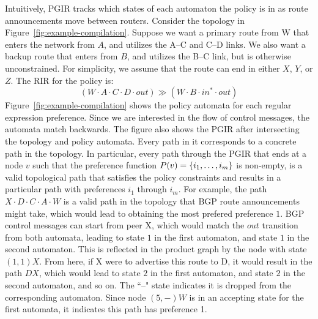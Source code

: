Intuitively, PGIR tracks which states of each automaton the policy is in as route announcements move between routers.
%
Consider the topology in Figure~\ref{fig:example-compilation}. Suppose we want a primary route from W that enters the network from $A$, and utilizes the A--C and C--D links. We also want a backup route that enters from $B$, and utilizes the B--C link, but is otherwise unconstrained. For simplicity, we assume that the route can end in either $X$, $Y$, or $Z$. The RIR for the policy is:
%
$$(W \cdot A \cdot C \cdot D \cdot out) \gg (W \cdot B \cdot in^* \cdot out)$$
%
Figure~\ref{fig:example-compilation} shows the policy automata for each regular expression preference. Since we are interested in the flow of control messages, the automata match backwards.
%
The figure also shows the PGIR after intersecting the topology and policy automata. Every path in it corresponds to a concrete path in the topology. In particular, every path through the PGIR that ends at a node $v$ such that the preference function $P(v) = \{ i_1, \dots, i_m \} $ is non-empty, is a valid topological path that satisfies the policy constraints and results in a particular path with preferences $i_1$ through $i_m$.
%
For example, the path $X \cdot D \cdot C \cdot A \cdot W$ is a valid path in the topology that BGP route announcements might take, which would lead to obtaining the most prefered preference $1$.
BGP control messages can start from peer X, which would match the $out$ transition from both automata, leading to state $1$ in the first automaton, and state $1$ in the second automaton. This is reflected in the product graph by the node with state $(1,1) X$. From here, if X were to advertise this route to D, it would result in the path $D X$, which would lead to state $2$ in the first automaton, and state $2$ in the second automaton, and so on.
%
The ``--" state indicates it is dropped from the corresponding automaton. Since node $(5,-) W$ is in an accepting state for the first automata, it indicates this path has preference 1.

